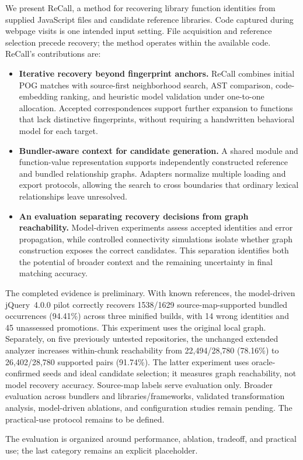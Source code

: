 We present ReCall, a method for recovering library function identities from supplied JavaScript files and candidate reference libraries. Code captured during webpage visits is one intended input setting. File acquisition and reference selection precede recovery; the method operates within the available code. ReCall's contributions are:
\begin{itemize}
\item \textbf{Iterative recovery beyond fingerprint anchors.} ReCall combines initial POG matches with source-first neighborhood search, AST comparison, code-embedding ranking, and heuristic model validation under one-to-one allocation. Accepted correspondences support further expansion to functions that lack distinctive fingerprints, without requiring a handwritten behavioral model for each target.
\item \textbf{Bundler-aware context for candidate generation.} A shared module and function-value representation supports independently constructed reference and bundled relationship graphs. Adapters normalize multiple loading and export protocols, allowing the search to cross boundaries that ordinary lexical relationships leave unresolved.
\item \textbf{An evaluation separating recovery decisions from graph reachability.} Model-driven experiments assess accepted identities and error propagation, while controlled connectivity simulations isolate whether graph construction exposes the correct candidates. This separation identifies both the potential of broader context and the remaining uncertainty in final matching accuracy.
\end{itemize}

The completed evidence is preliminary. With known references, the model-driven jQuery~4.0.0 pilot correctly recovers 1538/1629 source-map-supported bundled occurrences (94.41\%) across three minified builds, with 14 wrong identities and 45 unassessed promotions. This experiment uses the original local graph. Separately, on five previously untested repositories, the unchanged extended analyzer increases within-chunk reachability from 22,494/28,780 (78.16\%) to 26,402/28,780 supported pairs (91.74\%). The latter experiment uses oracle-confirmed seeds and ideal candidate selection; it measures graph reachability, not model recovery accuracy. Source-map labels serve evaluation only. Broader evaluation across bundlers and libraries/frameworks, validated transformation analysis, model-driven ablations, and configuration studies remain pending. The practical-use protocol remains to be defined.

The evaluation is organized around performance, ablation, tradeoff, and practical use; the last category remains an explicit placeholder.
